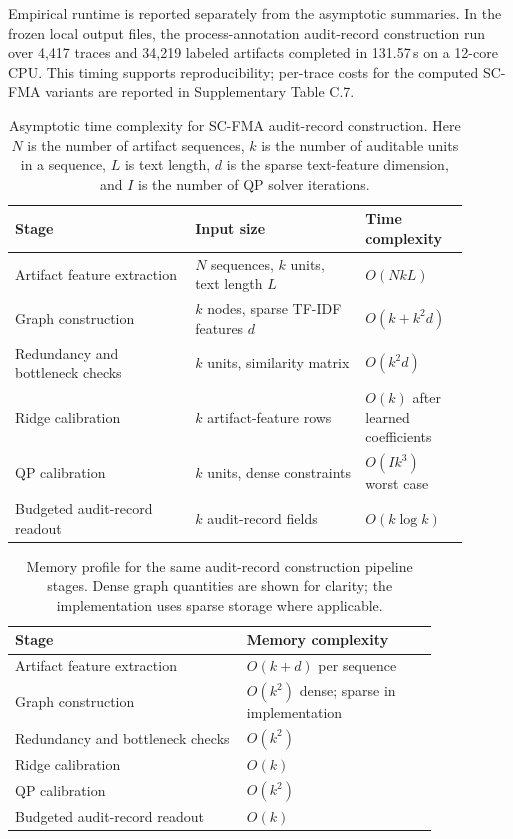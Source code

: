 \documentclass[pdflatex,sn-mathphys-num,iicol]{sn-jnl}
\begin{document}
Empirical runtime is reported separately from the asymptotic summaries. In the frozen local output files, the process-annotation audit-record construction run over 4,417 traces and 34,219 labeled artifacts completed in 131.57\,s on a 12-core CPU. This timing supports reproducibility; per-trace costs for the computed SC-FMA variants are reported in Supplementary Table C.7.

\begin{table}[ht]
\caption{Asymptotic time complexity for SC-FMA audit-record construction. Here $N$ is the number of artifact sequences, $k$ is the number of auditable units in a sequence, $L$ is text length, $d$ is the sparse text-feature dimension, and $I$ is the number of QP solver iterations.}
\label{tab:complexity-summary}
\centering
\small
\renewcommand{\arraystretch}{1.08}
\begin{tabular}{p{0.36\linewidth}p{0.34\linewidth}p{0.20\linewidth}}
\toprule
\textbf{Stage} & \textbf{Input size} & \textbf{Time complexity} \\
\midrule
Artifact feature extraction & $N$ sequences, $k$ units, text length $L$ & $O(NkL)$ \\
Graph construction & $k$ nodes, sparse TF-IDF features $d$ & $O(k+k^2d)$ \\
Redundancy and bottleneck checks & $k$ units, similarity matrix & $O(k^2d)$ \\
Ridge calibration & $k$ artifact-feature rows & $O(k)$ after learned coefficients \\
QP calibration & $k$ units, dense constraints & $O(Ik^3)$ worst case \\
Budgeted audit-record readout & $k$ audit-record fields & $O(k\log k)$ \\
\bottomrule
\end{tabular}
\end{table}

\begin{table}[ht]
\caption{Memory profile for the same audit-record construction pipeline stages. Dense graph quantities are shown for clarity; the implementation uses sparse storage where applicable.}
\label{tab:memory-summary}
\centering
\small
\renewcommand{\arraystretch}{1.08}
\begin{tabular}{p{0.46\linewidth}p{0.38\linewidth}}
\toprule
\textbf{Stage} & \textbf{Memory complexity} \\
\midrule
Artifact feature extraction & $O(k+d)$ per sequence \\
Graph construction & $O(k^2)$ dense; sparse in implementation \\
Redundancy and bottleneck checks & $O(k^2)$ \\
Ridge calibration & $O(k)$ \\
QP calibration & $O(k^2)$ \\
Budgeted audit-record readout & $O(k)$ \\
\bottomrule
\end{tabular}
\end{table}
\end{document}
